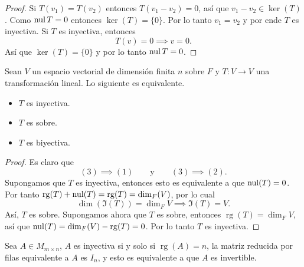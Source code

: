\documentclass[12pt,a4paper]{book}
\DeclareMathOperator{\rg}{rg}
\newcommand{\llaves}[1]{\{#1\}}
\begin{document}
    \begin{proof}
        Si $T(v_1) = T(v_2)$ entonces $T(v_1 - v_2) = 0$, así que $v_1 - v_2 \in \ker(T)$. Como $\operatorname{nul}{T} = 0$ entonces $\ker(T) = \llaves{0}$. Por lo tanto $v_1 = v_2$ y por ende $T$ es inyectiva. Si $T$ es inyectiva, entonces
        \begin{equation*}
            T(v) = 0 \implies v = 0.
        \end{equation*}
        Así que $\ker(T) = \llaves{0}$ y por lo tanto $\operatorname{nul}{T} = 0$.
    \end{proof}

    \begin{corolario}
        Sean $V$ un espacio vectorial de dimensión finita $n$ sobre $F$ y $T: V \to V$ una transformación lineal. Lo siguiente es equivalente.
        \begin{itemize}
            \item[(1)] $T$ es inyectiva.
            \item[(2)] $T$ es sobre.
            \item[(3)] $T$ es biyectiva.
        \end{itemize}
    \end{corolario}
    
    \begin{proof}
        Es claro que
        \begin{equation*}
            (3) \implies (1) \qquad \text{y} \qquad (3) \implies (2).
        \end{equation*}
        Supongamos que $T$ es inyectiva, entonces esto es equivalente a que $\operatorname{nul}(T) = 0$. Por tanto $\rg(T) + \nul(T) = \rg(T) = \dim_F(V)$, por lo cual
        \begin{equation*}
            \dim(\Im(T)) = \dim_F V \implies \Im(T) = V.
        \end{equation*}
        Así, $T$ es sobre. Supongamos ahora que $T$ es sobre, entonces $\rg(T) = \dim_F V$, así que $\nul(T) = \dim_F(V) - \rg(T) = 0$. Por lo tanto $T$ es inyectiva. 
    \end{proof}


    Sea $A \in M_{m \times n}$, $A$ es inyectiva si y solo si $\rg(A) = n$, la matriz reducida por filas equivalente a $A$ es $I_n$, y esto es equivalente a que $A$ es invertible.
\end{document}
